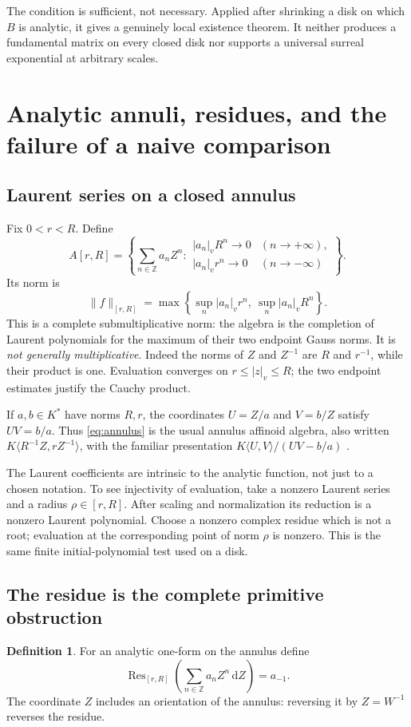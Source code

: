 \documentclass[11pt,a4paper]{article}
\numberwithin{equation}{section}
\theoremstyle{definition}
\newtheorem{definition}[theorem]{Definition}
\theoremstyle{remark}
\newcommand{\Z}{\mathbb Z}
\newcommand{\vabs}[1]{\lvert#1\rvert_v}
\newcommand{\Gauss}[2]{\lVert#1\rVert_{#2}}
\newcommand{\Res}{\operatorname{Res}}
\newcommand{\dd}{\,\mathrm d}
\begin{document}
The condition is sufficient, not necessary. Applied after shrinking a disk on
which $B$ is analytic, it gives a genuinely local existence theorem. It neither
produces a fundamental matrix on every closed disk nor supports a universal
surreal exponential at arbitrary scales.

\section{Analytic annuli, residues, and the failure of a naive comparison}
\label{sec:annuli}

\subsection{Laurent series on a closed annulus}
Fix $0<r<R$. Define
\begin{equation}\label{eq:annulus}
 A[r,R]=\left\{\sum_{n\in\Z}a_nZ^n:
 \begin{array}{ll}
  \vabs{a_n}R^n\to0& (n\to+\infty),\\
  \vabs{a_n}r^n\to0& (n\to-\infty)
 \end{array}\right\}.
\end{equation}
Its norm is
\[
 \Gauss f{[r,R]}=
 \max\left\{\sup_n\vabs{a_n}r^n,\ \sup_n\vabs{a_n}R^n\right\}.
\]
This is a complete submultiplicative norm: the algebra is the completion of
Laurent polynomials for the maximum of their two endpoint Gauss norms. It is
\emph{not generally multiplicative}. Indeed the norms of $Z$ and $Z^{-1}$
are $R$ and $r^{-1}$, while their product is one. Evaluation converges on
$r\le\vabs z\le R$; the two endpoint estimates justify the Cauchy product.

If $a,b\in K^*$ have norms $R,r$, the coordinates $U=Z/a$ and $V=b/Z$
satisfy $UV=b/a$. Thus \eqref{eq:annulus} is the usual annulus affinoid algebra,
also written $K\langle R^{-1}Z,rZ^{-1}\rangle$, with the familiar presentation
$K\langle U,V\rangle/(UV-b/a)$ \cite[Section 3]{Temkin}.

The Laurent coefficients are intrinsic to the analytic function, not just to a
chosen notation. To see injectivity of evaluation, take a nonzero Laurent
series and a radius $\rho\in[r,R]$. After scaling and normalization its
reduction is a nonzero Laurent polynomial. Choose a nonzero complex residue
which is not a root; evaluation at the corresponding point of norm $\rho$
is nonzero. This is the same finite initial-polynomial test used on a disk.

\subsection{The residue is the complete primitive obstruction}
\begin{definition}
For an analytic one-form on the annulus define
\[
 \Res_{[r,R]}\left(\sum_{n\in\Z}a_nZ^n\dd Z\right)=a_{-1}.
\]
The coordinate $Z$ includes an orientation of the annulus: reversing it by
$Z=W^{-1}$ reverses the residue.
\end{definition}
\end{document}
